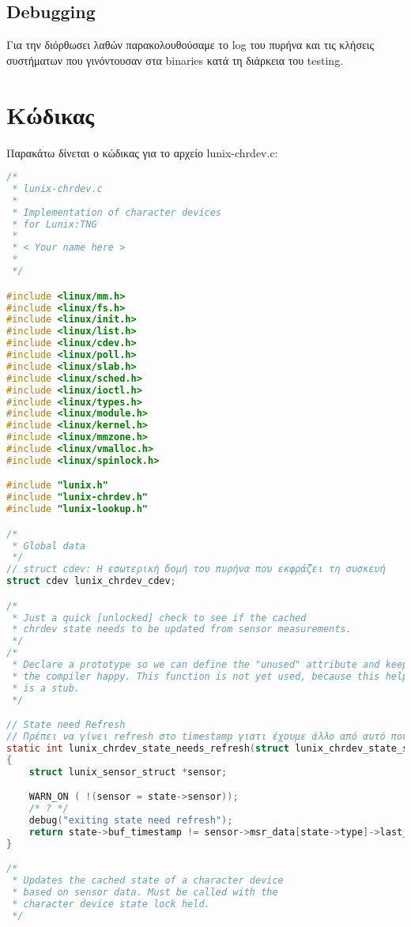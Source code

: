 \documentclass{article}
\begin{document}
\subsection{Debugging}
Για την διόρθωσει λαθών παρακολουθούσαμε το log του πυρήνα και τις κλήσεις συστήματων που γινόντουσαν
στα binaries κατά τη διάρκεια του testing. \\

\section{Κώδικας}
Παρακάτω δίνεται ο κώδικας για το αρχείο lunix-chrdev.c: \\
\begin{lstlisting}[language=C,basicstyle=\tiny]
/*
 * lunix-chrdev.c
 *
 * Implementation of character devices
 * for Lunix:TNG
 *
 * < Your name here >
 *
 */

#include <linux/mm.h>
#include <linux/fs.h>
#include <linux/init.h>
#include <linux/list.h>
#include <linux/cdev.h>
#include <linux/poll.h>
#include <linux/slab.h>
#include <linux/sched.h>
#include <linux/ioctl.h>
#include <linux/types.h>
#include <linux/module.h>
#include <linux/kernel.h>
#include <linux/mmzone.h>
#include <linux/vmalloc.h>
#include <linux/spinlock.h>

#include "lunix.h"
#include "lunix-chrdev.h"
#include "lunix-lookup.h"

/*
 * Global data
 */
// struct cdev: Η εσωτερική δομή του πυρήνα που εκφράζει τη συσκευή
struct cdev lunix_chrdev_cdev;

/*
 * Just a quick [unlocked] check to see if the cached
 * chrdev state needs to be updated from sensor measurements.
 */
/*
 * Declare a prototype so we can define the "unused" attribute and keep
 * the compiler happy. This function is not yet used, because this helpcode
 * is a stub.
 */

// State need Refresh
// Πρέπει να γίνει refresh στο timestamp γιατι έχουμε άλλο από αυτό που θέλουμε
static int lunix_chrdev_state_needs_refresh(struct lunix_chrdev_state_struct *state)
{
	struct lunix_sensor_struct *sensor;

	WARN_ON ( !(sensor = state->sensor));
	/* ? */
	debug("exiting state need refresh");
	return state->buf_timestamp != sensor->msr_data[state->type]->last_update;
}

/*
 * Updates the cached state of a character device
 * based on sensor data. Must be called with the
 * character device state lock held.
 */



\end{lstlisting}
\end{document}
